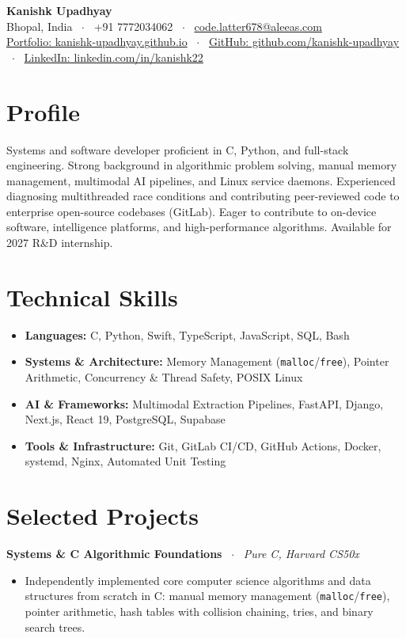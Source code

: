\documentclass[10pt,a4paper]{article}
\begin{document}
\begin{center}
    {\huge \textbf{Kanishk Upadhyay}} \\ \vspace{2pt}
    Bhopal, India \ $\cdot$ \ +91 7772034062 \ $\cdot$ \ \href{mailto:code.latter678@aleeas.com}{code.latter678@aleeas.com} \\ \vspace{2pt}
    \href{https://kanishk-upadhyay.github.io/}{Portfolio: kanishk-upadhyay.github.io} \ $\cdot$ \ 
    \href{https://github.com/kanishk-upadhyay}{GitHub: github.com/kanishk-upadhyay} \ $\cdot$ \ 
    \href{https://linkedin.com/in/kanishk22}{LinkedIn: linkedin.com/in/kanishk22}
\end{center}

\vspace{-6pt}
\section{Profile}
Systems and software developer proficient in C, Python, and full-stack engineering. Strong background in algorithmic problem solving, manual memory management, multimodal AI pipelines, and Linux service daemons. Experienced diagnosing multithreaded race conditions and contributing peer-reviewed code to enterprise open-source codebases (GitLab). Eager to contribute to on-device software, intelligence platforms, and high-performance algorithms. Available for 2027 R\&D internship.

\section{Technical Skills}
\begin{itemize}
    \item \textbf{Languages:} C, Python, Swift, TypeScript, JavaScript, SQL, Bash
    \item \textbf{Systems \& Architecture:} Memory Management (\texttt{malloc}/\texttt{free}), Pointer Arithmetic, Concurrency \& Thread Safety, POSIX Linux
    \item \textbf{AI \& Frameworks:} Multimodal Extraction Pipelines, FastAPI, Django, Next.js, React 19, PostgreSQL, Supabase
    \item \textbf{Tools \& Infrastructure:} Git, GitLab CI/CD, GitHub Actions, Docker, systemd, Nginx, Automated Unit Testing
\end{itemize}

\section{Selected Projects}
\textbf{Systems \& C Algorithmic Foundations} \ $\cdot$ \ \textit{Pure C, Harvard CS50x}
\begin{itemize}
    \item Independently implemented core computer science algorithms and data structures from scratch in C: manual memory management (\texttt{malloc}/\texttt{free}), pointer arithmetic, hash tables with collision chaining, tries, and binary search trees.
\end{itemize}
\end{document}
